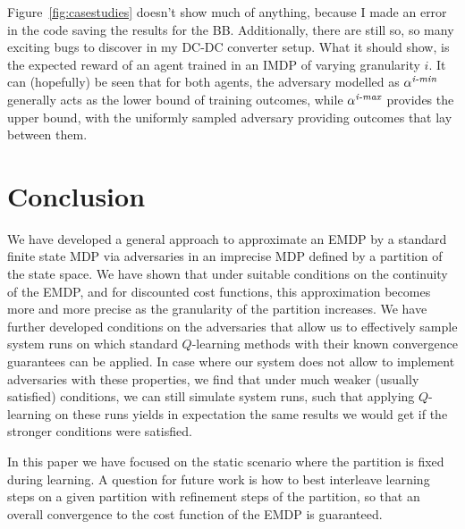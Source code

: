 \documentclass{llncs}
\begin{document}
Figure~\ref{fig:casestudies} doesn't show much of anything, because I made an error in the code saving the 
results for the BB. 
Additionally, there are still so, so many exciting bugs to discover in my DC-DC converter setup. 
What it should show, is the expected reward of an agent trained in an IMDP of varying granularity $i$. 
It can (hopefully) be seen that for both agents, the adversary modelled as $\alpha^{\emph{i-min}}$ generally acts as 
the lower bound of training outcomes, while $\alpha^{\emph{i-max}}$ provides the upper bound, 
with the uniformly sampled adversary providing outcomes that lay between them. 



\section{Conclusion}

We have developed a general approach to approximate an EMDP  by a standard finite
state MDP via adversaries in an imprecise MDP defined by a partition of the state space.
We have shown that under suitable conditions on the
continuity of the EMDP, and for discounted cost functions, this approximation becomes
more and more precise as the granularity of the partition increases. We have further developed
conditions on the adversaries that allow us to effectively sample system runs on which standard
$Q$-learning methods with their known convergence guarantees can be applied. In case where
our system does not allow to implement adversaries with these properties, we find that under
much weaker (usually satisfied) conditions, we can still simulate system runs, such that applying
$Q$-learning on these runs yields in expectation the same results we would get if the stronger
conditions were satisfied.

In this paper we have focused on the static scenario where the partition is fixed during learning.
A question for future work is how to best interleave learning steps on a given partition with
refinement steps of the partition, so that an overall convergence to the cost function of the
EMDP is guaranteed.






%
\end{document}
